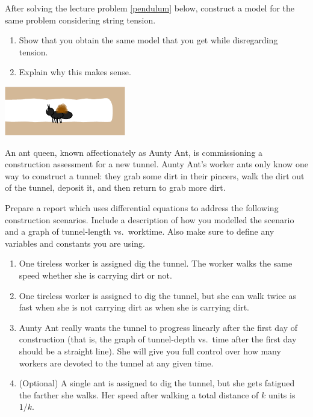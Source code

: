 \begin{exercises}
\begin{problist}
	\prob After solving the lecture problem \ref{pendulum} below, construct a model for the same problem considering string tension.
	\begin{enumerate}
		\item Show that you obtain the same model that you get while disregarding tension.
		\item Explain why this makes sense.
	\end{enumerate}
	
	\begin{center}
		\includegraphics*[width=150pt]{images/module11-ant_tunnel.pdf}
	\end{center}
	
	\prob 	An ant queen, known affectionately as Aunty Ant, is commissioning a construction assessment
	for a new tunnel.  Aunty Ant's worker ants only know one way to construct a tunnel: they grab some dirt in their pincers,
	walk the dirt out of the tunnel, deposit it, and then return to grab more dirt.
	
	Prepare a report which uses differential equations to address the following construction scenarios.  Include a
	description of how you modelled the scenario and a graph of tunnel-length vs.~worktime.
	Also make sure to define any variables and constants you are using.

	\begin{enumerate}
		\item One tireless worker is assigned dig the tunnel.  The worker walks the same speed
			whether she is carrying dirt or not.
		\item One tireless worker is assigned to dig the tunnel, but she can walk twice as fast
			when she is not carrying dirt as when she is carrying dirt.
		\item Aunty Ant really wants the tunnel to progress linearly after the first
			day of construction (that is, the graph of tunnel-depth vs.~time after
			the first day should be a straight line).  She will give you full control over
			how many workers are devoted to the tunnel at any given time.
		\item (Optional) A single ant is assigned to dig the tunnel, but she gets fatigued
			the farther she walks.  Her speed after walking a total distance of $k$ units is $1/k$.


\end{enumerate}
\end{problist}
\end{exercises}
